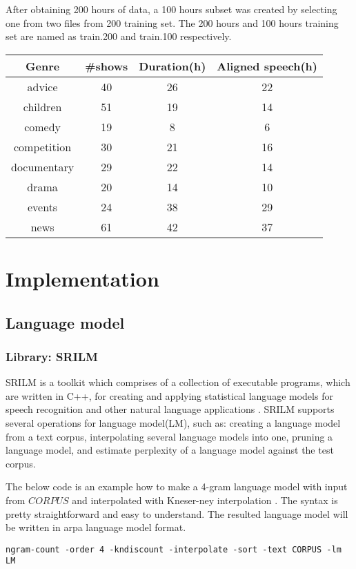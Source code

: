  After obtaining 200 hours of data, a 100 hours subset was created by selecting one from two files from 200 training set. The 200 hours and 100 hours training set are named as train.200 and train.100 respectively. 

\begin{center}
\label{statisticstrain200}
\begin{tabular}{ | c | c | c | c|}
\hline
\textbf{Genre} & \textbf{\#shows}  & \textbf{Duration(h)} & Aligned speech(h) \\ \hline \hline
advice & 40 & 26 & 22 \\ \hline
children & 51 & 19 & 14 \\ \hline
comedy & 19 & 8 & 6 \\ \hline
competition & 30 & 21 & 16 \\ \hline
documentary & 29 & 22 & 14 \\ \hline
drama & 20 & 14 & 10 \\ \hline
events & 24 & 38 & 29 \\ \hline
news & 61 & 42 & 37 \\ \hline
\end{tabular}
\end{center}



\section{Implementation}
\subsection{Language model}
\subsubsection{Library: SRILM}
SRILM is a toolkit which comprises of a collection of executable programs, which are written in C++, for creating and applying statistical language models for speech recognition and other natural language applications \cite{Stolcke02srilm}. SRILM supports several operations for language model(LM), such as: creating a language model from a text corpus, interpolating several language models into one, pruning a language model, and estimate perplexity of a language model against the test corpus. 

The below code is an example how to make a 4-gram language model with input from $CORPUS$ and interpolated with Kneser-ney interpolation \cite{KneserNey1993}. The syntax is pretty straightforward and easy to understand. The resulted language model will be written in arpa language model format.
\begin{verbatim}
ngram-count -order 4 -kndiscount -interpolate -sort -text CORPUS -lm LM
\end{verbatim}

